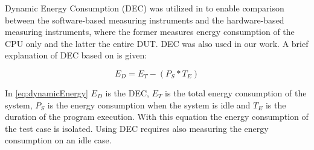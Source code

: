 Dynamic Energy Consumption (DEC) was utilized in \cite{fahad2019comparative,biksbois} to enable comparison between the software-based measuring instruments and the hardware-based measuring instruments, where the former measures energy consumption of the CPU only and the latter the entire DUT. DEC was also used in our work. A brief explanation of DEC based on \cite{fahad2019comparative} is given:

\begin{equation}\label{eq:dynamicEnergy}
    E_D = E_T - (P_S * T_E)
\end{equation}

In \cref{eq:dynamicEnergy} $E_D$ is the DEC, $E_T$ is the total energy consumption of the system, $P_S$ is the energy consumption when the system is idle and $T_E$ is the duration of the program execution. With this equation the energy consumption of the test case is isolated. Using DEC requires also measuring the energy consumption on an idle case. \cite{fahad2019comparative}
